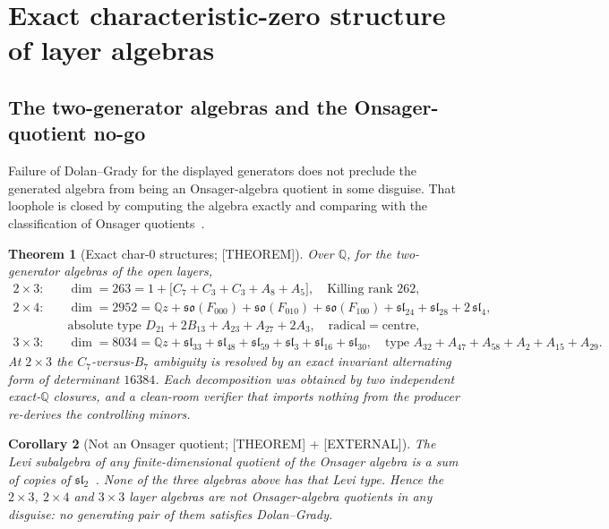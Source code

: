 \documentclass[11pt]{article}
\newtheorem{theorem}{Theorem}[section]
\newtheorem{corollary}[theorem]{Corollary}
\theoremstyle{definition}
\newcommand{\Qb}{\mathbb{Q}}
\begin{document}
\section{Exact characteristic-zero structure of layer algebras}\label{sec:char0}

\subsection{The two-generator algebras and the Onsager-quotient no-go}
Failure of Dolan--Grady for the displayed generators does not preclude the generated algebra from
being an Onsager-algebra quotient in some disguise. That loophole is closed by computing the algebra
exactly and comparing with the classification of Onsager
quotients~\cite{date_roan2000_onsager,roan1991_onsager}.

\begin{theorem}[Exact char-$0$ structures; {[THEOREM]}]\label{thm:char0}
Over $\Qb$, for the two-generator algebras of the open layers,
\begin{align*}
2\times3:\quad &\dim=263=1+\bigl[C_7+C_3+C_3+A_8+A_5\bigr],\quad\text{Killing rank }262,\\
2\times4:\quad &\dim=2952=\Qb z+\mathfrak{so}(F_{000})+\mathfrak{so}(F_{010})+\mathfrak{so}(F_{100})
+\mathfrak{sl}_{24}+\mathfrak{sl}_{28}+2\,\mathfrak{sl}_4,\\
&\text{absolute type }D_{21}+2B_{13}+A_{23}+A_{27}+2A_3,\quad\text{radical}=\text{centre},\\
3\times3:\quad &\dim=8034=\Qb z+\mathfrak{sl}_{33}+\mathfrak{sl}_{48}+\mathfrak{sl}_{59}
+\mathfrak{sl}_3+\mathfrak{sl}_{16}+\mathfrak{sl}_{30},\quad\text{type }A_{32}+A_{47}+A_{58}+A_2+A_{15}+A_{29}.
\end{align*}
At $2\times3$ the $C_7$-versus-$B_7$ ambiguity is resolved by an exact invariant alternating form of
determinant $16384$. Each decomposition was obtained by two independent exact-$\Qb$ closures, and a
clean-room verifier that imports nothing from the producer re-derives the controlling minors.
\end{theorem}

\begin{corollary}[Not an Onsager quotient; {[THEOREM]} + {[EXTERNAL]}]\label{cor:oa}
The Levi subalgebra of any finite-dimensional quotient of the Onsager algebra is a sum of copies of
$\mathfrak{sl}_2$~\cite{date_roan2000_onsager}. None of the three algebras above has that Levi type.
Hence the $2\times3$, $2\times4$ and $3\times3$ layer algebras are not Onsager-algebra quotients in
any disguise: no generating pair of them satisfies Dolan--Grady.
\end{corollary}
\end{document}
